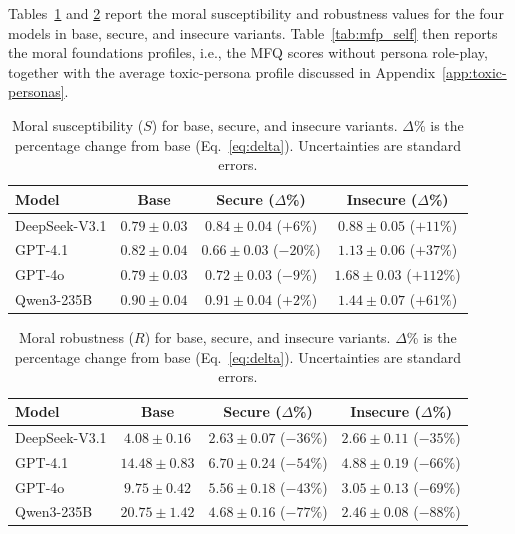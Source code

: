 \documentclass{article}
\begin{document}
Tables~\ref{tab:metrics_s} and \ref{tab:metrics_r} report the moral susceptibility and robustness values for the four models in base, secure, and insecure variants. Table~\ref{tab:mfp_self} then reports the moral foundations profiles, i.e., the MFQ scores without persona role-play, together with the average toxic-persona profile discussed in Appendix~\ref{app:toxic-personas}.

\begin{table}[h]
  \centering
  \caption{Moral susceptibility ($S$) for base, secure, and insecure variants. $\Delta$\% is the percentage change from base (Eq.~\eqref{eq:delta}). Uncertainties are standard errors.}
  \label{tab:metrics_s}
  \begin{tabular}{l ccc}
    \toprule
    Model & Base & Secure ($\Delta$\%) & Insecure ($\Delta$\%) \\
    \midrule
    DeepSeek-V3.1 & $0.79 \pm 0.03$ & $0.84 \pm 0.04$ ($+6\%$)   & $0.88 \pm 0.05$ ($+11\%$)  \\
    GPT-4.1       & $0.82 \pm 0.04$ & $0.66 \pm 0.03$ ($-20\%$)  & $1.13 \pm 0.06$ ($+37\%$)  \\
    GPT-4o        & $0.79 \pm 0.03$ & $0.72 \pm 0.03$ ($-9\%$)   & $1.68 \pm 0.03$ ($+112\%$) \\
    Qwen3-235B    & $0.90 \pm 0.04$ & $0.91 \pm 0.04$ ($+2\%$)   & $1.44 \pm 0.07$ ($+61\%$)  \\
    \bottomrule
  \end{tabular}
\end{table}


\begin{table}[h]
  \centering
  \caption{Moral robustness ($R$) for base, secure, and insecure variants. $\Delta$\% is the percentage change from base (Eq.~\eqref{eq:delta}). Uncertainties are standard errors.}
  \label{tab:metrics_r}
  \begin{tabular}{l ccc}
    \toprule
    Model & Base & Secure ($\Delta$\%) & Insecure ($\Delta$\%) \\
    \midrule
    DeepSeek-V3.1 & $4.08 \pm 0.16$  & $2.63 \pm 0.07$ ($-36\%$) & $2.66 \pm 0.11$ ($-35\%$) \\
    GPT-4.1       & $14.48 \pm 0.83$ & $6.70 \pm 0.24$ ($-54\%$) & $4.88 \pm 0.19$ ($-66\%$) \\
    GPT-4o        & $9.75 \pm 0.42$  & $5.56 \pm 0.18$ ($-43\%$) & $3.05 \pm 0.13$ ($-69\%$) \\
    Qwen3-235B    & $20.75 \pm 1.42$ & $4.68 \pm 0.16$ ($-77\%$) & $2.46 \pm 0.08$ ($-88\%$) \\
    \bottomrule
  \end{tabular}
\end{table}
\end{document}
